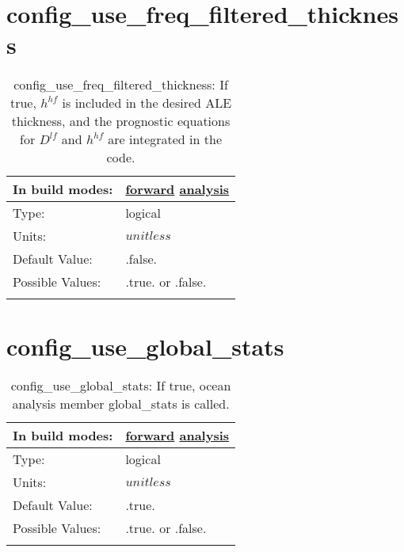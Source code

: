 \section[config\_use\_freq\_filtered\_thickness]{config\_use\_freq\_filtered\_thickness}
\label{sec:nm_sec_config_use_freq_filtered_thickness}
\begin{center}
\begin{longtable}{| p{2.0in} || p{4.0in} |}
    \hline
    In build modes: & \hyperref[subsec:forward_nm_tab_ALE_frequency_filtered_thickness]{forward} \hyperref[subsec:analysis_nm_tab_ALE_frequency_filtered_thickness]{analysis} \\
    \hline
    Type: & logical \\
    \hline
    Units: & $unitless$ \\
    \hline
    Default Value: & .false. \\
    \hline
    Possible Values: & .true. or .false. \\
    \hline
    \caption{config\_use\_freq\_filtered\_thickness:  If true,  $h^{hf}$  is included in the desired ALE thickness, and the prognostic equations for  $D^{lf}$  and  $h^{hf}$  are integrated in the code.}
\end{longtable}
\end{center}
\section[config\_use\_global\_stats]{config\_use\_global\_stats}
\label{sec:nm_sec_config_use_global_stats}
\begin{center}
\begin{longtable}{| p{2.0in} || p{4.0in} |}
    \hline
    In build modes: & \hyperref[subsec:forward_nm_tab_global_stats]{forward} \hyperref[subsec:analysis_nm_tab_global_stats]{analysis} \\
    \hline
    Type: & logical \\
    \hline
    Units: & $unitless$ \\
    \hline
    Default Value: & .true. \\
    \hline
    Possible Values: & .true. or .false. \\
    \hline
    \caption{config\_use\_global\_stats: If true, ocean analysis member global\_stats is called.}
\end{longtable}
\end{center}
